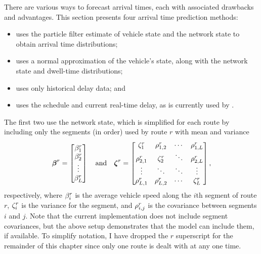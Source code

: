 There are various ways to forecast arrival times, each with associated drawbacks and advantages. This section presents four arrival time prediction methods:
\begin{itemize}
\item \Fpf{} uses the particle filter estimate of vehicle state and the network state to obtain arrival time distributions;
\item \Fnorm{} uses a normal approximation of the vehicle's state, along with the network state and dwell-time distributions;
\item \Fhist{} uses only historical delay data; and
\item \Fsched{} uses the schedule and current real-time delay, as is currently used by \AT{}.
\end{itemize}
The first two use the network state, which is simplified for each route by including only the segments (in order) used by route $r$ with mean and variance
\begin{equation}
\label{eq:route_nw_state}
\boldsymbol\beta^r =
\begin{bmatrix}
\beta^r_1 \\
\beta^r_2 \\
\vdots \\
\beta^r_L
\end{bmatrix}\quad\text{and}\quad
\boldsymbol{\zeta}^r =
\begin{bmatrix}
\zeta^r_{1} & \rho^r_{1,2} & \cdots &\rho^r_{1,L} \\
\rho^r_{2,1} & \zeta^r_{2} & \ddots &\rho^r_{2,L} \\
\vdots & \ddots & \ddots & \vdots \\
\rho^r_{L,1} & \rho^r_{L,2} & \cdots & \zeta^r_L
\end{bmatrix},
\end{equation}
respectively, where $\beta^r_{i}$ is the average vehicle speed along the $i$th segment of route $r$, $\zeta^r_{i}$ is the variance for the segment, and $\rho^r_{i,j}$ is the covariance between segments $i$ and $j$. Note that the current implementation does not include segment covariances, but the above setup demonstrates that the model can include them, if available. To simplify notation, I have dropped the $r$ superscript for the remainder of this chapter since only one route is dealt with at any one time.

